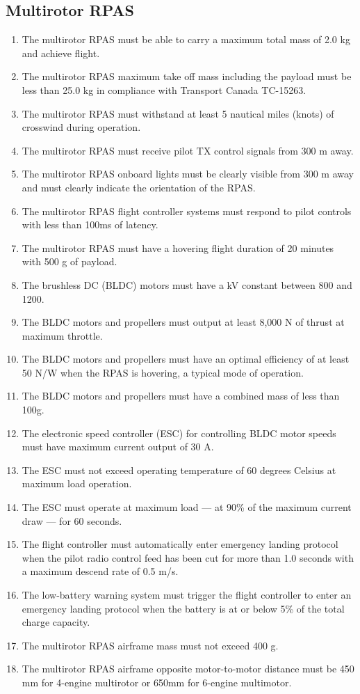 \documentclass[10pt,letterpaper]{article}
\begin{document}
\subsection{Multirotor RPAS}
\begin{enumerate}[label=NF.DR.\arabic*, wide=1cm, widest=3cm, leftmargin=*, font=\bfseries, noitemsep,topsep=0pt, parsep=4pt, partopsep=0pt]
	\item The multirotor RPAS must be able to carry a maximum total mass of 2.0 kg and achieve flight.
	\item The multirotor RPAS maximum take off mass including the payload must be less than 25.0 kg in compliance with Transport Canada TC-15263.\cite{tp15263}
	\item The multirotor RPAS must withstand at least 5 nautical miles (knots) of crosswind during operation.
	\item The multirotor RPAS must receive pilot TX control signals from 300 m away.
	\item The multirotor RPAS onboard lights must be clearly visible from 300 m away and must clearly indicate the orientation of the RPAS.
	\item The multirotor RPAS flight controller systems must respond to pilot controls with less than 100ms of latency.
	\item The multirotor RPAS must have a hovering flight duration of 20 minutes with 500 g of payload.
	\item The brushless DC (BLDC) motors must have a kV constant between 800 and 1200.
	\item The BLDC motors and propellers must output at least 8,000 N of thrust at maximum throttle.
	\item The BLDC motors and propellers must have an optimal efficiency of at least 50 N/W when the RPAS is hovering, a typical mode of operation.
	\item The BLDC motors and propellers must have a combined mass of less than 100g.
	\item The electronic speed controller (ESC) for controlling BLDC motor speeds must have maximum current output of 30 A.
	\item The ESC must not exceed operating temperature of 60 degrees Celsius at maximum load operation.
	\item The ESC must operate at maximum load --- at 90\% of the maximum current draw --- for 60 seconds.
	\item The flight controller must automatically enter emergency landing protocol when the pilot radio control feed has been cut for more than 1.0 seconds with a maximum descend rate of 0.5 m/s.
	\item The low-battery warning system must trigger the flight controller to enter an emergency landing protocol when the battery is at or below 5\% of the total charge capacity.
	\item The multirotor RPAS airframe mass must not exceed 400 g.
	\item The multirotor RPAS airframe opposite motor-to-motor distance must be 450 mm for 4-engine multirotor or 650mm for 6-engine multimotor.
\end{enumerate}
\end{document}
